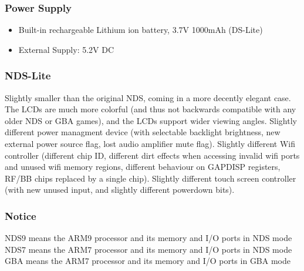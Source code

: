 \documentclass[11pt,a4paper]{proc}
\begin{document}
\begin{flushleft}
\subsubsection{Power Supply}
\begin{itemize}
\item Built-in rechargeable Lithium ion battery, 3.7V 1000mAh (DS-Lite)
\item External Supply: 5.2V DC
\end{itemize}

\subsubsection{NDS-Lite}
Slightly smaller than the original NDS, coming in a more decently elegant case. The LCDs are much more colorful (and thus not backwards compatible with any older NDS or GBA games), and the LCDs support wider viewing angles. Slightly different power managment device (with selectable backlight brightness, new external power source flag, lost audio amplifier mute flag). Slightly different Wifi controller (different chip ID, different dirt effects when accessing invalid wifi ports and unused wifi memory regions, different behaviour on GAPDISP registers, RF/BB chips replaced by a single chip). Slightly different touch screen controller (with new unused input, and slightly different powerdown bits).

\subsubsection{Notice}
NDS9 means the ARM9 processor and its memory and I/O ports in NDS mode
NDS7 means the ARM7 processor and its memory and I/O ports in NDS mode
GBA means the ARM7 processor and its memory and I/O ports in GBA mode


\end{flushleft}
\end{document}

